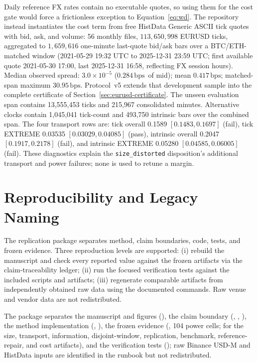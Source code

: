 \documentclass[3p]{elsarticle}
\newcommand{\bps}{\ensuremath{\mathrm{bps}}}
\begin{document}
Daily reference FX rates contain no executable quotes, so using them for the
cost gate would force a frictionless exception to Equation~\eqref{eq:wd}. The
repository instead instantiates the cost term from free HistData Generic
ASCII tick quotes with bid, ask, and volume: 56 monthly files,
$113{,}650{,}998$ EURUSD ticks, aggregated to $1{,}659{,}616$ one-minute
last-quote bid/ask bars over a BTC/ETH-matched window (2021-05-29 19:32 UTC
to 2025-12-31 23:59 UTC; first available quote 2021-05-30 17:00, last
2025-12-31 16:58, reflecting FX session hours). Median observed spread:
$3.0\times10^{-5}$ ($0.284$\,\bps\ of mid); mean $0.417$\,\bps; matched-span
maximum $30.95$\,\bps. Protocol~v5 extends that development sample into the
complete certificate of Section~\ref{sec:eurusd-certificate}. The unseen
evaluation span contains 13,555,453 ticks and 215,967 consolidated minutes.
Alternative clocks contain 1,045,041 tick-count and 493,750 intrinsic bars
over the combined span. The four transport rows are: tick overall 0.1589
$[0.1483,0.1697]$ (fail), tick EXTREME 0.03535
$[0.03029,0.04085]$ (pass), intrinsic overall 0.2047
$[0.1917,0.2178]$ (fail), and intrinsic EXTREME 0.05280
$[0.04585,0.06005]$ (fail). These diagnostics explain the
\texttt{size\_distorted} disposition's additional transport and power
failures; none is used to retune a margin.

\section{Reproducibility and Legacy Naming}
\label{app:repro}

The replication package separates method, claim boundaries, code, tests, and
frozen evidence. Three reproduction levels are supported: (i) rebuild the
manuscript and check every reported value against the frozen artifacts via
the claim-traceability ledger; (ii) run the focused verification tests
against the included scripts and artifacts; (iii) regenerate comparable
artifacts from independently obtained raw data using the documented commands.
Raw venue and vendor data are not redistributed.

The package separates the manuscript and figures (), the claim
boundary (, ,
), the method implementation (,
), the frozen evidence
(, 104 power cells;  for
the size, transport, information, disjoint-window, replication, benchmark,
reference-repair, and cost artifacts), and the verification tests
(); raw Binance USD-M and HistData inputs are identified in
the runbook but not redistributed.
\end{document}
